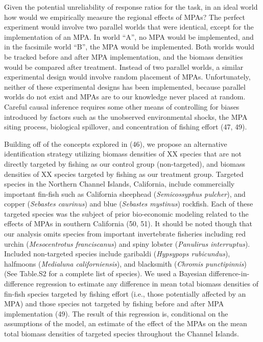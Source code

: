 \documentclass[9pt,twocolumn,twoside,lineno]{pnas-new}
\begin{document}
Given the potential unreliability of response ratios for the task, in an
ideal world how would we empirically measure the regional effects of
MPAs? The perfect experiment would involve two parallel worlds that were
identical, except for the implementation of an MPA. In world ``A'', no
MPA would be implemented, and in the facsimile world ``B'', the MPA
would be implemented. Both worlds would be tracked before and after MPA
implementation, and the biomass densities would be compared after
treatment. Instead of two parallel worlds, a similar experimental design
would involve random placement of MPAs. Unfortunately, neither of these
experimental designs has been implemented, because parallel worlds do
not exist and MPAs are to our knowledge never placed at random. Careful
causal inference requires some other means of controlling for biases
introduced by factors such as the unobserved environmental shocks, the
MPA siting process, biological spillover, and concentration of fishing
effort (47, 49).

Building off of the concepts explored in (46), we propose an alternative
identification strategy utilizing biomass densities of XX species that
are not directly targeted by fishing as our control group
(non-targeted), and biomass densities of XX species targeted by fishing
as our treatment group. Targeted species in the Northern Channel
Islands, California, include commercially important fin-fish such as
California sheephead (\emph{Semicossyphus pulcher}), and copper
(\emph{Sebastes caurinus}) and blue (\emph{Sebastes mystinus}) rockfish.
Each of these targeted species was the subject of prior bio-economic
modeling related to the effects of MPAs in southern California (50, 51).
It should be noted though that our analysis omits species from important
invertebrate fisheries including red urchin (\emph{Mesocentrotus
franciscanus}) and spiny lobster (\emph{Panulirus interruptus}).
Included non-targeted species include garibaldi (\emph{Hypsypops
rubicundus}), halfmoons (\emph{Medialuna californiensis}), and
blacksmith (\emph{Chromis punctipinnis}) (See Table.S2 for a complete
list of species). We used a Bayesian difference-in-difference regression
to estimate any difference in mean total biomass densities of fin-fish
species targeted by fishing effort (i.e., those potentially affected by
an MPA) and those species not targeted by fishing before and after MPA
implementation (49). The result of this regression is, conditional on
the assumptions of the model, an estimate of the effect of the MPAs on
the mean total biomass densities of targeted species throughout the
Channel Islands.
\end{document}
